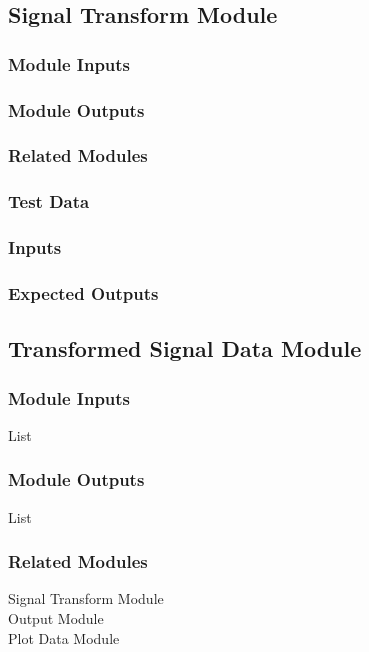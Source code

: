 \documentclass[12pt]{article}
\begin{document}
\subsection{Signal Transform Module}

\subsubsection{Module Inputs}

\subsubsection{Module Outputs}

\subsubsection{Related Modules}

\subsubsection{Test Data}

\subsubsection{Inputs}

\subsubsection{Expected Outputs}




\subsection{Transformed Signal Data Module}

\subsubsection{Module Inputs}
List
\subsubsection{Module Outputs}
List
\subsubsection{Related Modules}
Signal Transform Module\\
Output Module\\
Plot Data Module
\end{document}
